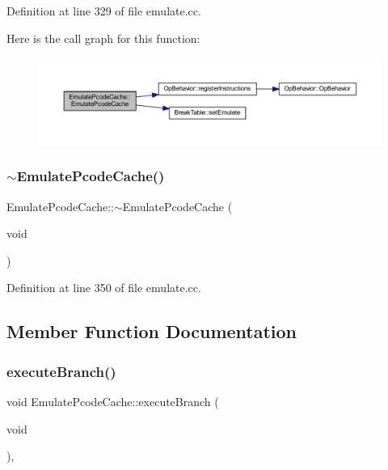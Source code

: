 Definition at line 329 of file emulate.\+cc.

Here is the call graph for this function\+:
\nopagebreak
\begin{figure}[H]
\begin{center}
\leavevmode
\includegraphics[width=350pt]{class_emulate_pcode_cache_a1efa63681c9911be126f6dd38a2fb4f6_cgraph}
\end{center}
\end{figure}
\mbox{\label{class_emulate_pcode_cache_a5729f300720a96149efc3d79573e4162}} 
\subsubsection{\texorpdfstring{$\sim$EmulatePcodeCache()}{~EmulatePcodeCache()}}
{\footnotesize\ttfamily Emulate\+Pcode\+Cache\+::$\sim$\+Emulate\+Pcode\+Cache (\begin{DoxyParamCaption}\item[{void}]{ }\end{DoxyParamCaption})}



Definition at line 350 of file emulate.\+cc.



\subsection{Member Function Documentation}
\mbox{\label{class_emulate_pcode_cache_a6108efef1c0291ca887228781e4c1238}} 
\subsubsection{\texorpdfstring{executeBranch()}{executeBranch()}}
{\footnotesize\ttfamily void Emulate\+Pcode\+Cache\+::execute\+Branch (\begin{DoxyParamCaption}\item[{void}]{ }\end{DoxyParamCaption})\hspace{0.3cm}{\ttfamily [protected]}, {\ttfamily [virtual]}}



